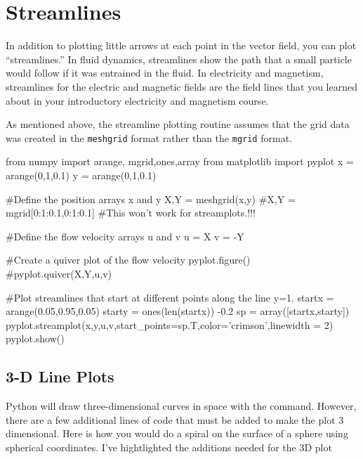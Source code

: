 \section{Streamlines}

In addition to plotting little arrows at each point in the vector field, you
can plot ``streamlines.'' In fluid dynamics, streamlines show the path that
a small particle would follow if it was entrained in the fluid.  In electricity and magnetism, streamlines for the
electric and magnetic fields are the field lines that you learned about in
your introductory electricity and magnetism course.

As mentioned above, the streamline plotting routine assumes that the grid data
was created in the {\tt meshgrid} format rather than the {\tt mgrid} format.

\begin{codeexample}
\begin{VerbatimOut}{\listingFile}
from numpy import arange, mgrid,ones,array
from matplotlib import pyplot
x = arange(0,1,0.1)
y = arange(0,1,0.1)

#Define the position arrays x and y
X,Y = meshgrid(x,y)
#X,Y = mgrid[0:1:0.1,0:1:0.1]  #This won't work for streamplots.!!!

#Define the flow velocity arrays u and v
u = X
v = -Y

#Create a quiver plot of the flow velocity
pyplot.figure()
#pyplot.quiver(X,Y,u,v)

#Plot streamlines that start at different points along the line y=1.
startx = arange(0.05,0.95,0.05)
starty = ones(len(startx)) -0.2
sp = array([startx,starty])
pyplot.streamplot(x,y,u,v,start_points=sp.T,color='crimson',linewidth = 2)
pyplot.show()
\end{VerbatimOut}
\end{codeexample}

\subsection*{3-D Line Plots}
   Python will
draw three-dimensional curves in space with the  command.
However, there are a few additional lines of code that must be added
to make the plot 3 dimensional.  Here is how you would do a spiral on
the surface of a sphere using spherical coordinates.  I've
hightlighted the additions needed for the 3D plot

